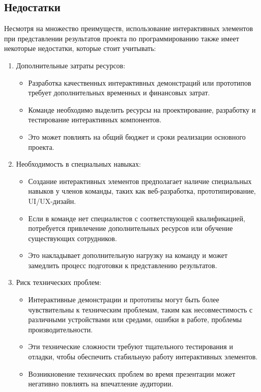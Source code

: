     \subsection{Недостатки}
    Несмотря на множество преимуществ, использование интерактивных элементов при представлении результатов проекта по программированию также имеет некоторые недостатки, которые стоит учитывать:
    \begin{enumerate}
        \item Дополнительные затраты ресурсов:
            \begin{itemize}
                \item Разработка качественных интерактивных демонстраций или прототипов требует дополнительных временных и финансовых затрат.
                \item Команде необходимо выделить ресурсы на проектирование, разработку и тестирование интерактивных компонентов.
                \item Это может повлиять на общий бюджет и сроки реализации основного проекта.
            \end{itemize}
        \item Необходимость в специальных навыках:
            \begin{itemize}
                \item Создание интерактивных элементов предполагает наличие специальных навыков у членов команды, таких как веб-разработка, прототипирование, UI/UX-дизайн.
                \item Если в команде нет специалистов с соответствующей квалификацией, потребуется привлечение дополнительных ресурсов или обучение существующих сотрудников.
                \item Это накладывает дополнительную нагрузку на команду и может замедлить процесс подготовки к представлению результатов.
            \end{itemize}
        \item Риск технических проблем:
            \begin{itemize}
                \item Интерактивные демонстрации и прототипы могут быть более чувствительны к техническим проблемам, таким как несовместимость с различными устройствами или средами, ошибки в работе, проблемы производительности.
                \item Эти технические сложности требуют тщательного тестирования и отладки, чтобы обеспечить стабильную работу интерактивных элементов.
                \item Возникновение технических проблем во время презентации может негативно повлиять на впечатление аудитории.

\end{itemize}
\end{enumerate}
